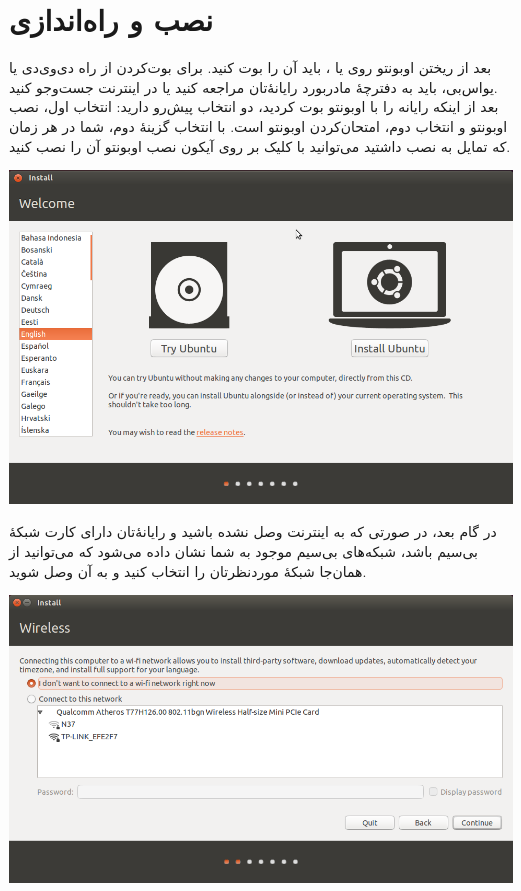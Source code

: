 \section{نصب و راه‌اندازی}
بعد از ریختن اوبونتو روی  یا ، باید آن را بوت کنید. برای 
بوت‌کردن از راه دی‌وی‌دی یا یواس‌بی، باید به دفترچهٔ مادربورد رایانهٔ‌تان مراجعه 
کنید یا در اینترنت جست‌وجو کنید.\\
بعد از اینکه رایانه را با اوبونتو بوت کردید، دو انتخاب پیش‌رو دارید: انتخاب اول، 
نصب اوبونتو و انتخاب دوم، امتحان‌کردن اوبونتو است. با انتخاب گزینهٔ دوم، شما در 
هر زمان که تمایل به نصب داشتید می‌توانید با کلیک بر روی آیکون نصب اوبونتو آن را 
نصب کنید.
\begin{center}
\includegraphics[scale=0.47]{pics/3.png}\\
\end{center}
در گام بعد، در صورتی که به اینترنت وصل نشده باشید و رایانهٔ‌تان دارای کارت شبکهٔ 
بی‌سیم باشد، شبکه‌های بی‌سیم موجود به شما نشان داده می‌شود که می‌توانید از 
همان‌جا شبکهٔ موردنظرتان را انتخاب کنید و به آن وصل شوید.
\begin{center}
\includegraphics[scale=0.47]{pics/4.png}\\
\end{center}

